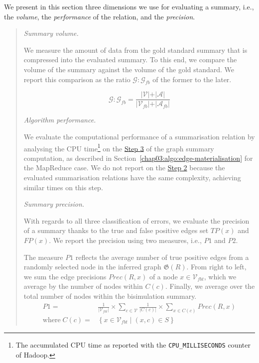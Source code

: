 We present in this section three dimensions we use for evaluating a summary, i.e., the \emph{volume}, the \emph{performance} of the relation, and the \emph{precision}.

\begin{quotation}
\item[\emph{Summary volume.}]

We measure the amount of data from the gold standard summary that is compressed into the evaluated summary. To this end, we compare the volume of the summary against the volume of the gold standard. We report this comparison as the ratio  $\mathcal{G}:\mathcal{G}_{fb}$ of the former to the later.

$$
\mathcal{G}:\mathcal{G}_{fb} = \frac{\vert \mathcal{V} \vert + \vert \mathcal{A} \vert}{\vert \mathcal{V}_{fb} \vert + \vert \mathcal{A}_{fb} \vert}
$$

\item[\emph{Algorithm performance.}]

We evaluate the computational performance of a summarisation relation by analysing the CPU time\footnote{The accumulated CPU time as reported with the \texttt{CPU\_MILLISECONDS} counter of Hadoop.} on the \hyperref[step-he]{Step 3} of the graph summary computation, as described in Section~\ref{chap03:algo:edge-materialisation} for the MapReduce case. We do not report on the \hyperref[step-hn]{Step 2} because the evaluated summarisation relations have the same complexity, achieving similar times on this step.

\item[\emph{Summary precision.}]

With regards to all three classification of errors, we evaluate the precision of a summary thanks to the true and false positive edges set $TP(x)$ and $FP(x)$.
We report the precision using two measures, i.e., $P1$ and $P2$.

The measure $P1$ reflects the average number of true positive edges from a randomly selected node in the inferred graph $\mathfrak{G}(R)$. From right to left, we sum the edge precisions $Prec(R, x)$ of a node $x\in \mathcal{V}_{fbt}$, which we average by the number of nodes within $C(c)$. Finally, we average over the total number of nodes within the bisimulation summary.
$$
\begin{aligned}
P1 = & \frac{1}{\vert \mathcal{V}_{fbt} \vert} \times \sum_{c \in \mathcal{V}}{\frac{1}{\vert C(c) \vert} \times \sum_{x \in C(c)}{Prec(R, x)}} \\
\text{where}\; C(c) = & \left\lbrace x \in \mathcal{V}_{fbt} \mid (x, c) \in S \right\rbrace
\end{aligned}
$$


\end{quotation}
